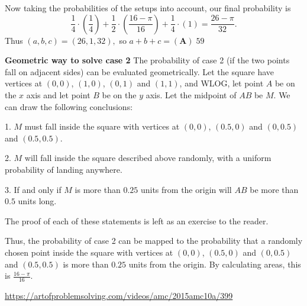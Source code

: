 \begin{enumerate}
 
Now taking the probabilities of the setups into account, our final probability is 
 \[\frac{1}{4}\cdot \left( \frac{1}{4} \right)+ \frac{1}{2}\cdot \left(\frac{16-\pi}{16}\right) + \frac{1}{4}\cdot \left(1\right)=\frac{26-\pi}{32}.\]Thus $(a,b,c)=(26,1,32),$ so $a+b+c= \boxed{\mathbf{(A)}\;59}$

 \textbf{Geometric way to solve case 2} The probability of case 2 (if the two points fall on adjacent sides) can be evaluated geometrically. Let the square have vertices at $(0,0)$, $(1,0)$, $(0,1)$ and $(1,1)$, and WLOG, let point $A$ be on the $x$ axis and let point $B$ be on the $y$ axis. Let the midpoint of $AB$ be $M$. We can draw the following conclusions:

 1. $M$ must fall inside the square with vertices at $(0,0)$, $(0.5,0)$ and $(0,0.5)$ and $(0.5,0.5)$.

 2. $M$ will fall inside the square described above randomly, with a uniform probability of landing anywhere.

 3. If and only if $M$ is more than $0.25$ units from the origin will $AB$ be more than $0.5$ units long.

 The proof of each of these statements is left as an exercise to the reader.

 Thus, the probability of case 2 can be mapped to the probability that a randomly chosen point inside the square with vertices at $(0,0)$, $(0.5,0)$ and $(0,0.5)$ and $(0.5,0.5)$ is more than $0.25$ units from the origin. By calculating areas, this is $\frac{16 - \pi}{16}$.

 \href{https://artofproblemsolving.com/videos/amc/2015amc10a/399}{https://artofproblemsolving.com/videos/amc/2015amc10a/399}

 


\end{enumerate}
